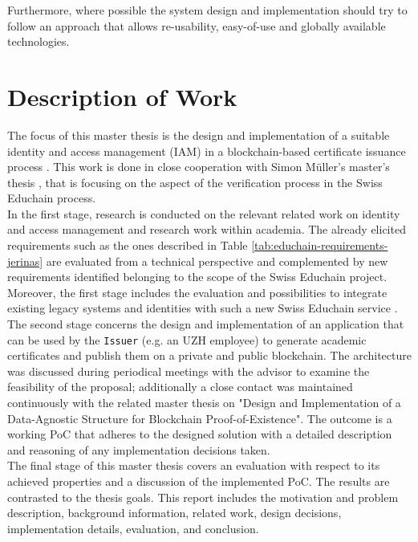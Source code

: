 Furthermore, where possible the system design and implementation should try to follow an approach that allows re-usability, easy-of-use and globally available technologies.


\section{Description of Work}

The focus of this master thesis is the design and implementation of a suitable identity and access management (IAM) in a blockchain-based certificate issuance process \cite{educhain-proposal}. This work is done in close cooperation with Simon M{\"u}ller's master's thesis \cite{mueller20}, that is focusing on the aspect of the verification process in the Swiss Educhain process. \\

In the first stage, research is conducted on the relevant related work on identity and access management and research work within academia. The already elicited requirements such as the ones described in Table \ref{tab:educhain-requirements-jerinas} are evaluated from a technical perspective and complemented by new requirements identified belonging to the scope of the Swiss Educhain project. Moreover, the first stage includes the evaluation and possibilities to integrate existing legacy systems and identities with such a new Swiss Educhain service \cite{educhain-proposal}. \\

The second stage concerns the design and implementation of an application that can be used by the \texttt{Issuer} (e.g. an UZH employee) to generate academic certificates and publish them on a private and public blockchain. The architecture was discussed during periodical meetings with the advisor to examine the feasibility of the proposal; additionally a close contact was maintained continuously with the related master thesis on "Design and Implementation of a Data-Agnostic Structure for Blockchain Proof-of-Existence". The outcome is a working PoC that adheres to the designed solution with a detailed description and reasoning of any implementation decisions taken. \\

The final stage of this master thesis covers an evaluation with respect to its achieved properties and a discussion of the implemented PoC. The results are contrasted to the thesis goals. This report includes the motivation and problem description, background information, related work, design decisions, implementation details, evaluation, and conclusion.


